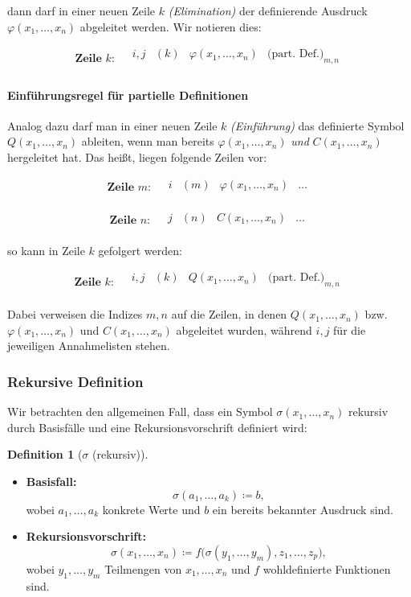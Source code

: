 \documentclass{book}
\theoremstyle{plain}
\theoremstyle{remark}
\theoremstyle{definition}
\newtheorem{definition}{Definition}[section]
\begin{document}
dann darf in einer neuen Zeile \(k\) \emph{(Elimination)} der definierende Ausdruck \(\varphi(x_1,\dots,x_n)\) abgeleitet werden. Wir notieren dies:

\[
\textbf{Zeile }k: 
\quad
\begin{array}{llll}
   i,j & (k) & \varphi(x_1,\dots,x_n) & \text{(part. Def.)}_{m,n} \\
\end{array}
\]

\paragraph{Einführungsregel für partielle Definitionen}
Analog dazu darf man in einer neuen Zeile \(k\) \emph{(Einf\"uhrung)} das definierte Symbol \(Q(x_1,\dots,x_n)\) ableiten, wenn man bereits \(\varphi(x_1,\dots,x_n)\) \emph{und} \(C(x_1,\dots,x_n)\) hergeleitet hat. Das hei\ss t, liegen folgende Zeilen vor:

\[
\textbf{Zeile }m: 
\quad
\begin{array}{llll}
   i & (m) & \varphi(x_1,\dots,x_n) & \dots \\
\end{array}
\]

\[
\textbf{Zeile }n: 
\quad
\begin{array}{llll}
   j & (n) & C(x_1,\dots,x_n) & \dots \\
\end{array}
\]

so kann in Zeile \(k\) gefolgert werden:

\[
\textbf{Zeile }k: 
\quad
\begin{array}{llll}
   i,j & (k) & Q(x_1,\dots,x_n) & \text{(part. Def.)}_{m,n} \\
\end{array}
\]

Dabei verweisen die Indizes \(m,n\) auf die Zeilen, in denen \(Q(x_1,\dots,x_n)\) bzw. \(\varphi(x_1,\dots,x_n)\) und \(C(x_1,\dots,x_n)\) abgeleitet wurden, während \(i,j\) für die jeweiligen Annahmelisten stehen.

\subsubsection{Rekursive Definition}
Wir betrachten den allgemeinen Fall, dass ein Symbol \(\sigma(x_1,\dots,x_n)\) rekursiv durch Basisfälle und eine Rekursionsvorschrift definiert wird:

\begin{definition}[\(\sigma\) (rekursiv)]
\label{dfSigmaGenRecursive}
\begin{itemize}
    \item \textbf{Basisfall:}
    \[
    \sigma(a_1, \ldots, a_k) \coloneqq b,
    \]
    wobei \(a_1, \ldots, a_k\) konkrete Werte und \(b\) ein bereits bekannter Ausdruck sind.
    \item \textbf{Rekursionsvorschrift:}
    \[
    \sigma(x_1, \ldots, x_n) \coloneqq f\big(\sigma(y_1, \ldots, y_m), z_1, \ldots, z_p\big),
    \]
    wobei \(y_1, \ldots, y_m\) Teilmengen von \(x_1, \ldots, x_n\) und \(f\) wohldefinierte Funktionen sind.
\end{itemize}
\end{definition}
\end{document}
